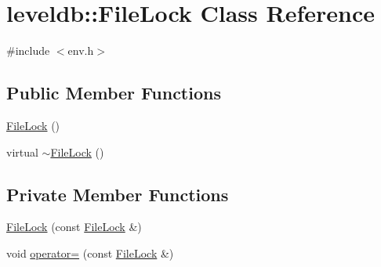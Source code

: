 \hypertarget{classleveldb_1_1_file_lock}{\section{leveldb\-:\-:File\-Lock Class Reference}
\label{classleveldb_1_1_file_lock}
}


{\ttfamily \#include $<$env.\-h$>$}

\subsection*{Public Member Functions}
\begin{DoxyCompactItemize}
\item 
\hyperlink{classleveldb_1_1_file_lock_a8521062a58d4069cebb6b54d599bdfdf}{File\-Lock} ()
\item 
virtual \hyperlink{classleveldb_1_1_file_lock_a18abaf2e46c1123be139ee5087f0936e}{$\sim$\-File\-Lock} ()
\end{DoxyCompactItemize}
\subsection*{Private Member Functions}
\begin{DoxyCompactItemize}
\item 
\hyperlink{classleveldb_1_1_file_lock_aecae5cbc71235fb0ba64ffe8e3e5be93}{File\-Lock} (const \hyperlink{classleveldb_1_1_file_lock}{File\-Lock} \&)
\item 
void \hyperlink{classleveldb_1_1_file_lock_a77635a508d3b15cfe635e9dbe4e172ec}{operator=} (const \hyperlink{classleveldb_1_1_file_lock}{File\-Lock} \&)
\end{DoxyCompactItemize}


